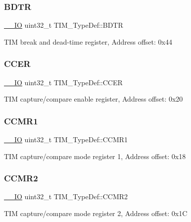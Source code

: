 \subsubsection{\texorpdfstring{BDTR}{BDTR}}
{\footnotesize\ttfamily \mbox{\hyperlink{core__sc300_8h_aec43007d9998a0a0e01faede4133d6be}{\+\_\+\+\_\+\+IO}} uint32\+\_\+t T\+I\+M\+\_\+\+Type\+Def\+::\+B\+D\+TR}

T\+IM break and dead-\/time register, Address offset\+: 0x44 \mbox{\label{struct_t_i_m___type_def_ad7271cc1eec9ef16e4ee5401626c0b3b}} 
\subsubsection{\texorpdfstring{CCER}{CCER}}
{\footnotesize\ttfamily \mbox{\hyperlink{core__sc300_8h_aec43007d9998a0a0e01faede4133d6be}{\+\_\+\+\_\+\+IO}} uint32\+\_\+t T\+I\+M\+\_\+\+Type\+Def\+::\+C\+C\+ER}

T\+IM capture/compare enable register, Address offset\+: 0x20 \mbox{\label{struct_t_i_m___type_def_a0f2291e7efdf3222689ef13e9be2ea4a}} 
\subsubsection{\texorpdfstring{CCMR1}{CCMR1}}
{\footnotesize\ttfamily \mbox{\hyperlink{core__sc300_8h_aec43007d9998a0a0e01faede4133d6be}{\+\_\+\+\_\+\+IO}} uint32\+\_\+t T\+I\+M\+\_\+\+Type\+Def\+::\+C\+C\+M\+R1}

T\+IM capture/compare mode register 1, Address offset\+: 0x18 \mbox{\label{struct_t_i_m___type_def_aa8129ca70a2232c91c8cfcaf375249f6}} 
\subsubsection{\texorpdfstring{CCMR2}{CCMR2}}
{\footnotesize\ttfamily \mbox{\hyperlink{core__sc300_8h_aec43007d9998a0a0e01faede4133d6be}{\+\_\+\+\_\+\+IO}} uint32\+\_\+t T\+I\+M\+\_\+\+Type\+Def\+::\+C\+C\+M\+R2}

T\+IM capture/compare mode register 2, Address offset\+: 0x1C \mbox{\label{struct_t_i_m___type_def_ac0dcd8f9118b07b16cd79d03cb1a0904}} 

